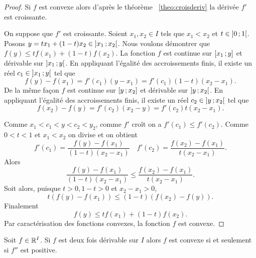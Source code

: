 \begin{proof}
  Si \(f\) est convexe alors d'après le théorème~
  \ref{theo:croisderiv} la dérivée \(f'\) est croissante.

  On suppose que \(f'\) est croissante. Soient \(x_1,x_2 \in I\) tels que 
  \(x_1<x_2\) et \(t \in \left] 0 \, ;  1 \right[\). Posons \(y=tx_1+(1-t)x_2 \in 
  \left] x_1 \, ;  x_2 \right[\). Nous voulons démontrer que \(f(y) \leqslant 
  tf(x_1)+(1-t)f(x_2)\). La fonction \(f\) est continue sur 
  \(\left[ x_1 \, ;  y \right]\) et dérivable sur \(\left] x_1 \, ;  y \right[\). En 
  appliquant l'égalité des accroissements finis, il existe un réel \(c_1 \in 
  \left] x_1 \, ;  y \right[\) tel que
  \begin{equation}
    f(y)-f(x_1)=f'(c_1)(y-x_1)=f'(c_1)(1-t)(x_2-x_1).
  \end{equation}
  De la même façon \(f\) est continue sur \(\left[ y \, ;  x_2 \right]\) et dérivable 
  sur \(\left] y \, ;  x_2 \right[\). En appliquant l'égalité des accroissements 
  finis, il existe un réel \(c_2 \in \left] y \, ;  x_2 \right[\) tel que
  \begin{equation}
    f(x_2)-f(y)=f'(c_2)(x_2-y)=f'(c_2)t(x_2-x_1).
  \end{equation}

  Comme \(x_1<c_1<y<c_2<y_2\), comme \(f'\) croît on a \(f'(c_1) \leqslant 
  f'(c_2)\). Comme \(0<t<1\) et \(x_1<x_2\) on divise et on obtient
  \begin{equation}
    f'(c_1) = \frac{f(y)-f(x_1)}{(1-t)(x_2-x_1)} \quad f'(c_2) = 
    \frac{f(x_2)-f(x_1)}{t(x_2-x_1)}.
  \end{equation}
  Alors
  \begin{equation}
    \frac{f(y)-f(x_1)}{(1-t)(x_2-x_1)} \leqslant 
    \frac{f(x_2)-f(x_1)}{t(x_2-x_1)}.
  \end{equation}
  Soit alors, puisque \(t>0, 1-t>0\) et \(x_2-x_1>0\),
  \begin{equation}
    t(f(y)-f(x_1)) \leqslant (1-t)(f(x_2)-f(y)).
  \end{equation}
  Finalement
  \begin{equation}
    f(y) \leqslant tf(x_1)+(1-t)f(x_2).
  \end{equation}
  Par caractérisation des fonctions convexes, la fonction \(f\) est convexe.
\end{proof}
\begin{corth}
  Soit \(f \in \mathbb{R}^I\). Si \(f\) est deux fois dérivable sur \(I\) alors \(f\) 
  est convexe si et seulement si \(f''\) est positive.
\end{corth}

